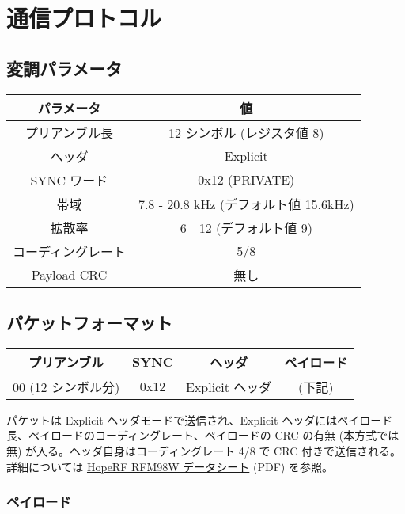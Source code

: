 \documentclass[a4j,oneside]{ujbook}
\begin{document}
\section*{通信プロトコル}

\subsection*{変調パラメータ}
\begin{center}
 \begin{tabular}{|c|c|}
  \hline
  {パラメータ} & {値} \\
  \hline
  {プリアンブル長} & {12 シンボル (レジスタ値 8)} \\
  {ヘッダ} & {Explicit} \\
  {SYNC ワード} & {0x12 (PRIVATE)} \\
  {帯域} & {7.8 - 20.8 kHz (デフォルト値 15.6kHz)} \\
  {拡散率} & {6 - 12 (デフォルト値 9)} \\
  {コーディングレート} & {5/8} \\
  {Payload CRC} & {無し} \\
  \hline
 \end{tabular}
\end{center}

\subsection*{パケットフォーマット}

\begin{center}
 \begin{tabular}{|c|c|c|c|}
  \hline
  {プリアンブル} & {SYNC} & {ヘッダ} & {ペイロード} \\
  \hline
  {00 (12 シンボル分)} & {0x12} & {Explicit ヘッダ} & {(下記)} \\
  \hline
 \end{tabular}
\end{center}

パケットは Explicit ヘッダモードで送信され、Explicit ヘッダにはペイロード長、ペイロードのコーディングレート、ペイロードの CRC の有無 (本方式では無) が入る。ヘッダ自身はコーディングレート 4/8 で CRC 付きで送信される。詳細については \href{https://www.hoperf.com/data/upload/portal/20190801/RFM98W-V2.0.pdf}{HopeRF RFM98W データシート} (PDF) を参照。

\subsubsection*{ペイロード}
\end{document}
